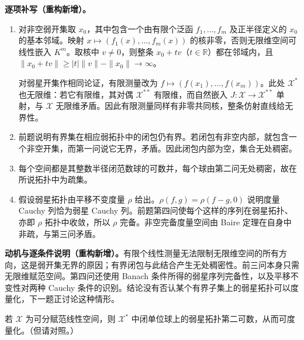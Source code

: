 \documentclass[../../main.tex]{subfiles}
\begin{document}
\begin{solution}
\textbf{逐项补写（重构新增）。}
\begin{enumerate}
\item 对非空弱开集取 $x_0$，其中包含一个由有限个泛函 $f_1,\ldots,f_m$ 及正半径定义的 $x_0$ 的基本邻域。映射 $x\mapsto(f_1(x),\ldots,f_m(x))$ 的核非零，否则无限维空间可线性嵌入 $K^m$。取核中 $v\ne0$，则整条 $x_0+tv$（$t\in\mathbb R$）都在邻域内，且 $\|x_0+tv\|\ge |t|\|v\|-\|x_0\|\to\infty$。

对弱星开集作相同论证，有限测量改为 $f\mapsto(f(x_1),\ldots,f(x_m))$。此处 $\mathcal X^*$ 也无限维：若它有限维，其对偶 $\mathcal X^{**}$ 有限维，而自然嵌入 $J:\mathcal X\to\mathcal X^{**}$ 单射，与 $\mathcal X$ 无限维矛盾。因此有限测量同样有非零共同核，整条仿射直线给无界性。
\item 前题说明有界集在相应弱拓扑中的闭包仍有界。若闭包有非空内部，就包含一个非空开集，而第一问说它无界，矛盾。因此闭包内部为空，集合无处稠密。
\item 每个空间都是其整数半径闭范数球的可数并，每个球由第二问无处稠密，故在所说拓扑中为疏集。
\item 假设弱星拓扑由平移不变度量 $\rho$ 给出。$\rho(f,g)=\rho(f-g,0)$ 说明度量 Cauchy 列恰为弱星 Cauchy 列。前题第四问使每个这样的序列在弱星拓扑、亦即 $\rho$ 拓扑中收敛，所以 $\rho$ 完备。非空完备度量空间由 Baire 定理在自身中非疏，与第三问矛盾。
\end{enumerate}
\end{solution}
\begin{remark}
\textbf{动机与逐条件说明（重构新增）。}有限个线性测量无法限制无限维空间的所有方向，这是弱开集无界的原因；有界闭包与此结合产生无处稠密性。前三问本身只需无限维赋范空间。第四问还使用 Banach 条件所得的弱星序列完备性，以及平移不变性对两种 Cauchy 条件的识别。结论没有否认某个有界子集上的弱星拓扑可以度量化，下一题正讨论这种情形。
\end{remark}
\begin{exercise}\label{exercise:ch05-separable-dual-ball-metrizable}
若 $\mathcal X$ 为可分赋范线性空间，则 $\mathcal X^*$ 中闭单位球上的弱星拓扑第二可数，从而可度量化。（但请对照。）
\end{exercise}
\end{document}
